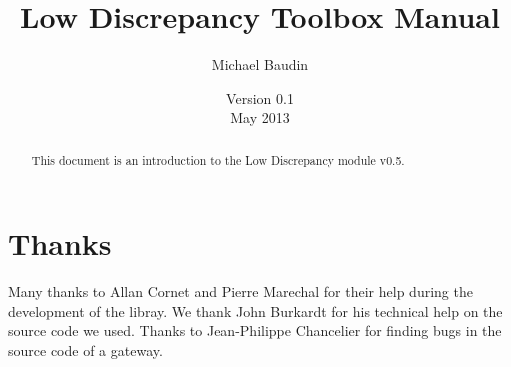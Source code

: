 \documentclass[12pt]{report}
\begin{document}
\title{Low Discrepancy Toolbox Manual}
\date{Version 0.1 \\May 2013}
\author{Michael Baudin}

\maketitle


\begin{abstract}
This document is an introduction to the Low Discrepancy module v0.5. 
\end{abstract}

\tableofcontents


















\chapter{Thanks}
Many thanks to Allan Cornet and Pierre Marechal for their help during the development of the libray. 
We thank John Burkardt for his technical help on the source code we used. 
Thanks to Jean-Philippe Chancelier for finding bugs in the source code of a gateway.

\clearpage



\printindex
\end{document}
